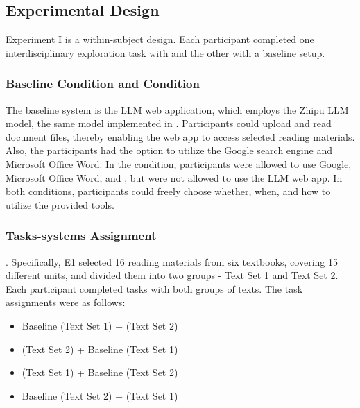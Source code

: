 \subsection{Experimental Design}
Experiment I is a within-subject design. Each participant completed one interdisciplinary exploration task with \name{} and the other with a baseline setup.

\subsubsection{Baseline Condition and \name{} Condition}
The baseline system is the LLM web application, which employs the Zhipu LLM model, the same model implemented in \name{}. 
Participants could upload and read document files, thereby enabling the web app to access selected reading materials. 
Also, the participants had the option to utilize the Google search engine and Microsoft Office Word. 
In the \name{} condition, participants were allowed to use Google, Microsoft Office Word, and \name{}, but were not allowed to use the LLM web app.
In both conditions, participants could freely choose whether, when, and how to utilize the provided tools.

\subsubsection{Tasks-systems Assignment}
. 
Specifically, E1 selected 16 reading materials from six textbooks, covering 15 different units, and divided them into two groups - Text Set 1 and Text Set 2.
Each participant completed tasks with both groups of texts. The task assignments were as follows:
\begin{itemize}
    \item Baseline (Text Set 1) + \name{} (Text Set 2)
    \item \name{} (Text Set 2) + Baseline (Text Set 1)
    \item \name{} (Text Set 1) + Baseline (Text Set 2)
    \item Baseline (Text Set 2) + \name{} (Text Set 1)
\end{itemize}

